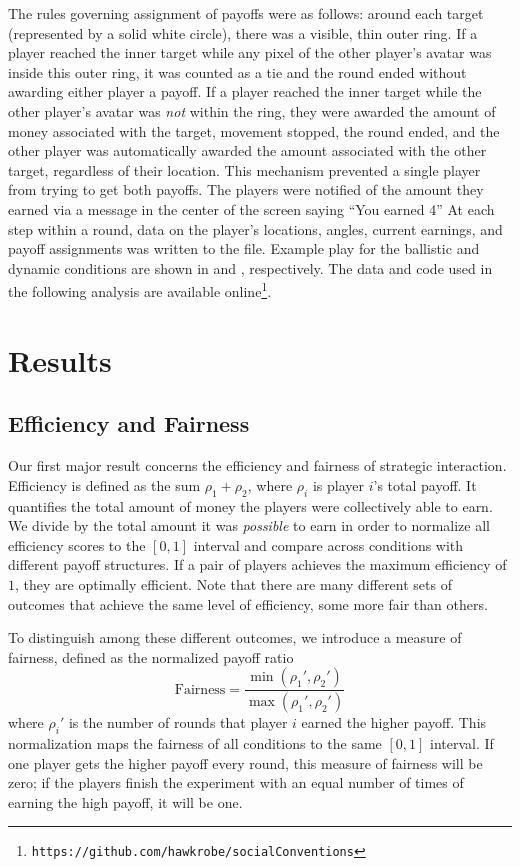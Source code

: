 \documentclass[10pt,letterpaper]{article}
\begin{document}
The rules governing assignment of payoffs were as follows: around each target (represented by a solid white circle), there was a visible, thin outer ring. If a player reached the inner target while any pixel of the other player's avatar was inside this outer ring, it was counted as a tie and the round ended without awarding either player a payoff. If a player reached the inner target while the other player's avatar was \emph{not} within the ring, they were awarded the amount of money associated with the target, movement stopped, the round ended, and the other player was automatically awarded the amount associated with the other target, regardless of their location. This mechanism prevented a single player from trying to get both payoffs. The players were notified of the amount they earned via a message in the center of the screen saying ``You earned 4\textcent [2\textcent]'' At each step within a round, data on the player's locations, angles, current earnings, and payoff assignments was written to the file. Example play for the ballistic and dynamic conditions are shown in  and , respectively. The data and code used in the following analysis are available online\footnote{\texttt{https://github.com/hawkrobe/socialConventions}}.

\section*{Results}

\subsection*{Efficiency and Fairness} Our first major result concerns the efficiency and fairness of strategic interaction. Efficiency is defined as the sum $\rho_1 + \rho_2$, where $\rho_i$ is player $i$'s total payoff. It quantifies the total amount of money the players were collectively able to earn. We divide by the total amount it was \emph{possible} to earn in order to normalize all efficiency scores to the $[0,1]$ interval and compare across conditions with different payoff structures. If a pair of players achieves the maximum efficiency of $1$, they are optimally efficient. Note that there are many different sets of outcomes that achieve the same level of efficiency, some more fair than others.

To distinguish among these different outcomes, we introduce a measure of fairness, defined as the normalized payoff ratio $$\text{Fairness} = \frac{\min(\rho_1', \rho_2')}{\max(\rho_1', \rho_2')}$$ where $\rho_i'$ is the number of rounds that player $i$ earned the higher payoff. This normalization maps the fairness of all conditions to the same $[0,1]$ interval. If one player gets the higher payoff every round, this measure of fairness will be zero; if the players finish the experiment with an equal number of times of earning the high payoff, it will be one. 
\end{document}
